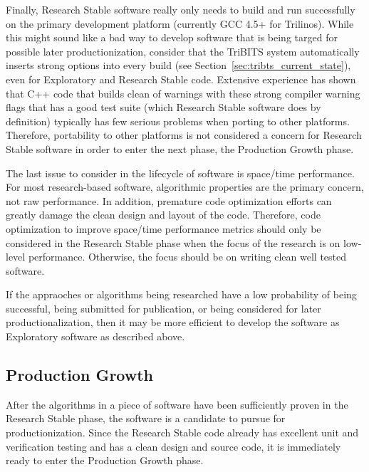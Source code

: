 \documentclass[11pt]{SANDreport}
\begin{document}
Finally, Research Stable software really only needs to build and run
successfully on the primary development platform (currently GCC 4.5+
for Trilinos).  While this might sound like a bad way to develop
software that is being targed for possible later productionization,
consider that the TriBITS system automatically inserts strong options
into every build (see Section~\ref{sec:tribts_current_state}), even
for Exploratory and Research Stable code.  Extensive experience has
shown that C++ code that builds clean of warnings with these strong
compiler warning flags that has a good test suite (which Research
Stable software does by definition) typically has few serious problems
when porting to other platforms.  Therefore, portability to other
platforms is not considered a concern for Research Stable software in
order to enter the next phase, the Production Growth phase.

The last issue to consider in the lifecycle of software is space/time
performance.  For most research-based software, algorithmic properties
are the primary concern, not raw performance.  In addition, premature
code optimization efforts can greatly damage the clean design and
layout of the code.  Therefore, code optimization to improve
space/time performance metrics should only be considered in the
Research Stable phase when the focus of the research is on low-level
performance.  Otherwise, the focus should be on writing clean well
tested software.

If the appraoches or algorithms being researched have a low
probability of being successful, being submitted for publication, or
being considered for later productionalization, then it may be more
efficient to develop the software as Exploratory software as described
above.


%
{}\subsection{Production Growth}
%

After the algorithms in a piece of software have been sufficiently
proven in the Research Stable phase, the software is a candidate to
pursue for productionization.  Since the Research Stable code already
has excellent unit and verification testing and has a clean design and
source code, it is immediately ready to enter the Production Growth
phase.
\end{document}
